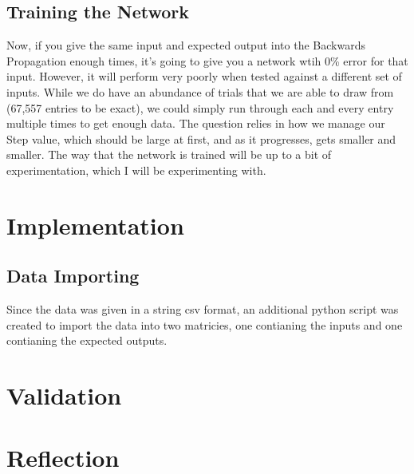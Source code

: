 \documentclass[10pt]{article}
\begin{document}
\subsection{Training the Network}
Now, if you give the same input and expected output into the Backwards Propagation enough times, it's going to give you a network wtih 0\% error for that input. However, it will perform very poorly when tested against a different set of inputs.\newline
While we do have an abundance of trials that we are able to draw from (67,557 entries to be exact), we could simply run through each and every entry multiple times to get enough data. The question relies in how we manage our Step value, which should be large at first, and as it progresses, gets smaller and smaller. The way that the network is trained will be up to a bit of experimentation, which I will be experimenting with.

\section{Implementation}
\subsection{Data Importing}
Since the data was given in a string csv format, an additional python script was created to import the data into two matricies, one contianing the inputs and one contianing the expected outputs.
\section{Validation}
\section{Reflection}
\end{document}
